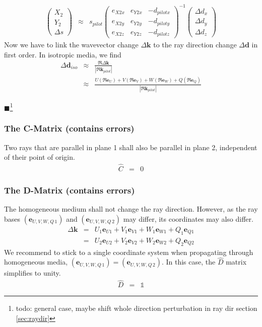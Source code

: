 \documentclass[12pt,a4paper,twoside,openright,BCOR10mm,headsepline,titlepage,abstracton,chapterprefix,final]{scrreprt}
\newcommand\Vector[1]{{\mathbf{#1}}}
\newcommand\wavenumber{k}
\newcommand\Wavevector{\Vector{\wavenumber}}
\newcommand\unittensor{\mathds{1}}
\newcommand{\remark}[1]{{\color{red}$\blacksquare$}\footnote{{\color{red}#1}}}
\begin{document}
\begin{eqnarray}
 \begin{pmatrix}
  X_2 \\ Y_2 \\ \Delta s
 \end{pmatrix} 
 &\approx& s_{pilot}
 \begin{pmatrix}
  e_{X2x} & e_{Y2x} & - d_{pilotx} \\
  e_{X2y} & e_{Y2y} & - d_{piloty} \\
  e_{X2z} & e_{Y2z} & - d_{pilotz} 
 \end{pmatrix}^{-1}
 \begin{pmatrix}
  \Delta d_x \\ \Delta d_y \\ \Delta d_z
 \end{pmatrix}
\end{eqnarray}
Now we have to link the wavevector change $\Delta \Wavevector$ to the ray direction change $\Delta \Vector{d}$ in first order.
In isotropic media, we find
\begin{eqnarray}
 \Delta \Vector{d}_{iso} 
 &\approx& \frac{\Re \Delta \Wavevector}{|\Re \Wavevector_{pilot}|}
 \\
 &\approx&
  \frac{
    U(\Re \Vector{e}_U)
    + V(\Re \Vector{e}_V)
    + W(\Re \Vector{e}_W)
    + Q(\Re \Vector{e}_Q)
  }{|\Re \Wavevector_{pilot}|}
\end{eqnarray}

\remark{todo: general case, maybe shift whole direction perturbation in ray dir section \ref{sec:raydir}}

\subsubsection{The C-Matrix (contains errors)} 
Two rays that are parallel in plane 1 shall also be parallel in plane 2, 
independent of their point of origin.
\begin{eqnarray}
\hat{C} &=& 0 
\end{eqnarray}

\subsubsection{The D-Matrix (contains errors)}
The homogeneous medium shall not change the ray direction.
However, as the ray bases $( \Vector{e}_{U,V,W,Q\,1} )$ and $( \Vector{e}_{U,V,W,Q\,2} )$
may differ, its coordinates may also differ.
\begin{eqnarray}
 \Delta \Wavevector 
 &=& U_1 \Vector{e}_{U1} + V_1 \Vector{e}_{V1} + W_1 \Vector{e}_{W1} + Q_1 \Vector{e}_{Q1} \nonumber \\
 &=& U_2 \Vector{e}_{U2} + V_2 \Vector{e}_{V2} + W_2 \Vector{e}_{W2} + Q_2 \Vector{e}_{Q2}
\end{eqnarray}
We recommend to stick to a single coordinate system when propagating through homogeneous media, 
$( \Vector{e}_{U,V,W,Q\,1} ) = ( \Vector{e}_{U,V,W,Q\,2} )$. 
In this case, the $\hat{D}$ matrix simplifies to unity.
\begin{eqnarray}
 \hat{D} &=& \unittensor
\end{eqnarray}
\end{document}
